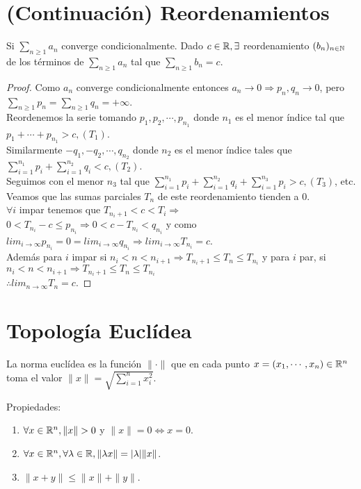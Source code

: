 \section{(Continuación) Reordenamientos}

\begin{theorem}
  Si $\sum_{n \geq 1} a_n$ converge condicionalmente. Dado $c \in \mathbb{R}, \exists$ reordenamiento $(b_n)_{n \in \mathbb{N}}$ de los términos de $\sum_{n \geq 1} a_n$ tal que $\sum_{n \geq 1} b_n = c$.
  \begin{proof}
    Como $a_n$ converge condicionalmente entonces $a_n \to 0 \Rightarrow p_n, q_n \to 0$, pero $\sum_{n \geq 1} p_n = \sum_{n \geq 1} q_n = +\infty$. \\
    Reordenemos la serie tomando $p_1, p_2, \cdots, p_{n_1}$ donde $n_1$ es el menor índice tal que $p_1 + \cdots + p_{n_1} > c, (T_1)$. \\
    Similarmente $-q_1, -q_2, \cdots, q_{n_2}$ donde $n_2$ es el menor índice tales que $\sum_{i = 1}^{n_1} p_i + \sum_{i = 1}^{n_2} q_i < c, (T_2)$. \\
    Seguimos con el menor $n_3$ tal que $\sum_{i = 1}^{n_1} p_i + \sum_{i = 1}^{n_2} q_i + \sum_{i = 1}^{n_3} p_i > c, (T_3)$, etc. \\
    Veamos que las sumas parciales $T_n$ de este reordenamiento tienden a 0. \\
    $\forall i$ impar tenemos que $T_{n_i +1} < c < T_i \Rightarrow$ \\
    $0 < T_{n_i} - c \leq p_{n_i} \Rightarrow 0 < c - T_{n_i} < q_{n_i}$ y como $lim_{i \to \infty} p_{n_i} = 0 = lim_{i \to \infty} q_{n_i} \Rightarrow lim_{i \to \infty} T_{n_i} = c$. \\
    Además para $i$ impar si $n_i < n < n_{i+1} \Rightarrow T_{n_i+1} \leq T_n \leq T_{n_i}$ y para $i$ par, si $n_i < n < n_{i+1} \Rightarrow T_{n_i+1} \leq T_n \leq T_{n_i}$ \\
    $\therefore lim_{n \to \infty} T_n = c$.
  \end{proof}
\end{theorem}

\section{Topología Euclídea}

\begin{definition}
  La norma euclídea es la función $\| \cdot \|$ que en cada punto $x = (x_1, \cdots, x_n) \in \mathbb{R}^n$ toma el valor $\|x\| = \sqrt{\sum_{i = 1}^n x_i^2}$.

  Propiedades: \\
  \begin{enumerate}
    \item $\forall x \in \mathbb{R}^n, \|x\| > 0$ y $\|x\| = 0 \iff x = 0$.
    \item $\forall x \in \mathbb{R}^n, \forall \lambda \in \mathbb{R}, \| \lambda x\| = |\lambda| \|x\|$.
    \item $\|x+y\| \leq \|x\| + \|y\|$.
  \end{enumerate}
\end{definition}

